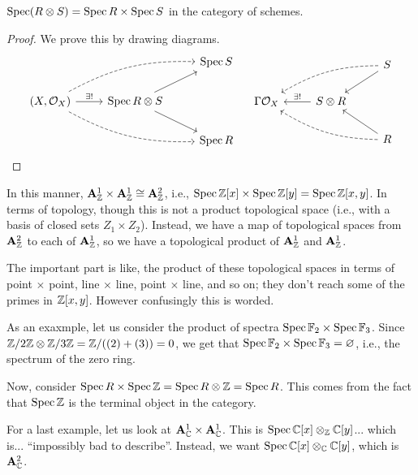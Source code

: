 \newpage
\begin{theorem} \label{thm:tensor_product_of_schemes}
    $\operatorname{Spec} (R \otimes S) = \operatorname{Spec} R \times \operatorname{Spec} S$ in the category of schemes.
\end{theorem}
\begin{proof}
    We prove this by drawing diagrams.
    \[ \begin{tikzcd}
    & & \Spec S \\
    (X, \SO_X) \arrow[r, "\exists!"] \arrow[rru, dashed, bend left = 15] \arrow[rrd, dashed, bend right = 15] & \Spec R \otimes S \arrow[ru] \arrow[rd] \\
    & & \Spec R
    \end{tikzcd} \quad \begin{tikzcd}
        & & S \arrow[dl] \arrow[lld, dashed, bend right = 15] \\
        \Gamma \SO_X & S \otimes R \arrow[l, "\exists!"'] \\
        & & R \arrow[ul] \arrow[llu, dashed, bend left = 15]
    \end{tikzcd} \qedhere \]
\end{proof}

In this manner, $\mathbf A_\mathbb Z^1 \times \mathbf A_\mathbb Z^1 \cong \mathbf A_\mathbb Z^2$, i.e., $\operatorname{Spec} \mathbb Z[x] \times \operatorname{Spec} \mathbb Z[y] = \operatorname{Spec} \mathbb Z[x, y]$. In terms of topology, though this is not a product topological space (i.e., with a basis of closed sets $Z_1 \times Z_2$). Instead, we have a map of topological spaces from $\mathbf A_\mathbb Z^2$ to each of $\mathbf A_\mathbb Z^1$, so we have a topological product of $\mathbf A_\mathbb Z^1$ and $\mathbf A_\mathbb Z^1$.

{\color{amethyst} The important part is like, the product of these topological spaces in terms of point $\times$ point, line $\times$ line, point $\times$ line, and so on; they don't reach some of the primes in $\mathbb Z[x, y]$. However confusingly this is worded.}

As an exaxmple, let us consider the product of spectra $\operatorname{Spec} \mathbb F_2 \times \operatorname{Spec} \mathbb F_3$. Since $\mathbb Z/2\mathbb Z \otimes \mathbb Z/3\mathbb Z = \mathbb Z/((2) + (3)) = {0}$, we get that $\operatorname{Spec} \mathbb F_2 \times \operatorname{Spec} \mathbb F_3 = \varnothing$, i.e., the spectrum of the zero ring. 

Now, consider $\operatorname{Spec} R \times \operatorname{Spec} \mathbb Z = \operatorname{Spec} R \otimes \mathbb Z = \operatorname{Spec} R$. This comes from the fact that $\operatorname{Spec} \mathbb Z$ is the terminal object in the category.

For a last example, let us look at $\mathbf A_\mathbb C^1 \times \mathbf A_\mathbb C^1$. This is $\operatorname{Spec} \mathbb C[x] \otimes_\mathbb Z \mathbb C[y]$... which is... ``impossibly bad to describe''. Instead, we want $\operatorname{Spec} \mathbb C[x] \otimes_\mathbb C \mathbb C[y]$, which is $\mathbf A_\mathbb C^2$.

